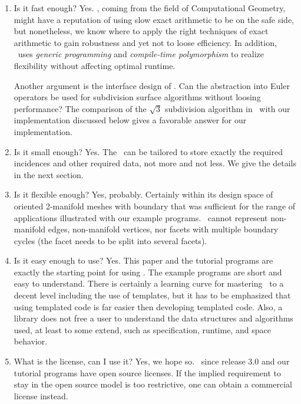 \begin{enumerate}
  \item
    Is it fast enough? Yes. \cgal, coming from the field of Computational
    Geometry, might have a reputation of using slow exact arithmetic
    to be on the safe side, but nonetheless, we know where to apply
    the right techniques of exact arithmetic to gain robustness and
    yet not to loose efficiency. In addition, \cgal\ uses
    \emph{generic programming\/} and \emph{compile-time
    polymorphism\/} to realize flexibility without affecting optimal
    runtime.

    Another argument is the interface design of \cgalpoly. Can the
    abstraction into Euler operators be used for subdivision surface
    algorithms without loosing performance? The comparison of the
    $\sqrt{3}$ subdivision algorithm in \openmesh\ with our
    implementation discussed below gives a favorable answer for our
    implementation.
  \item
    Is it small enough? Yes. The \cgalpoly\ can be tailored to store
    exactly the required incidences and other required data, not more and
    not less. We give the details in the next section.
  \item
    Is it flexible enough? Yes, probably. Certainly within its design
    space of oriented 2-manifold meshes with boundary that was
    sufficient for the range of applications illustrated with our
    example programs. \cgalpoly\ cannot represent non-manifold edges,
    non-manifold vertices, nor facets with multiple boundary cycles
    (the facet needs to be split into several facets).
  \item
    Is it easy enough to use? Yes. This paper and the tutorial
    programs are exactly the starting point for using \cgalpoly. The
    example programs are short and easy to understand. There is
    certainly a learning curve for mastering \CC\ to a decent level
    including the use of templates, but it has to be emphasized that
    using templated code is far easier then developing templated code.
    Also, a library does not free a user to understand the data
    structures and algorithms used, at least to some extend, such as 
    specification, runtime, and space behavior.
  \item
    What is the license, can I use it? Yes, we hope so. \cgal\ since
    release 3.0 and our tutorial programs have open source
    licenses. If the implied requirement to stay in the open source
    model is too restrictive, one can obtain a commercial license
    instead.
\end{enumerate}

